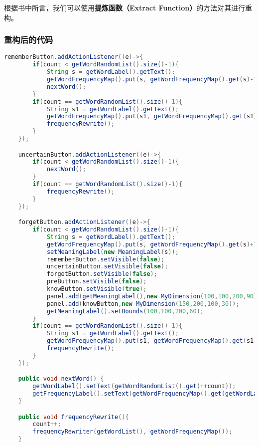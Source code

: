 \documentclass[a4paper]{article}
\begin{document}
根据书中所言，我们可以使用\textbf{提炼函数（Extract Function）}的方法对其进行重构。
\subsubsection*{重构后的代码}
\begin{lstlisting}[language={java}]
    rememberButton.addActionListener((e)->{
        if(count < getWordRandomList().size()-1){
            String s = getWordLabel().getText();
            getWordFrequencyMap().put(s, getWordFrequencyMap().get(s)-1);
            nextWord();
        }
        if(count == getWordRandomList().size()-1){
            String s1 = getWordLabel().getText();
            getWordFrequencyMap().put(s1, getWordFrequencyMap().get(s1)-1);
            frequencyRewrite();
        }
    });

    uncertainButton.addActionListener((e)->{
        if(count < getWordRandomList().size()-1){
            nextWord();
        }
        if(count == getWordRandomList().size()-1){
            frequencyRewrite();
        }
    });

    forgetButton.addActionListener((e)->{
        if(count < getWordRandomList().size()-1){
            String s = getWordLabel().getText();
            getWordFrequencyMap().put(s, getWordFrequencyMap().get(s)+1);
            setMeaningLabel(new MeaningLabel(s));
            rememberButton.setVisible(false);
            uncertainButton.setVisible(false);
            forgetButton.setVisible(false);
            preButton.setVisible(false);
            knowButton.setVisible(true);
            panel.add(getMeaningLabel(),new MyDimension(100,100,200,90));
            panel.add(knowButton,new MyDimension(150,200,100,30));
            getMeaningLabel().setBounds(100,100,200,60);
        }
        if(count == getWordRandomList().size()-1){
            String s1 = getWordLabel().getText();
            getWordFrequencyMap().put(s1, getWordFrequencyMap().get(s1)+1);
            frequencyRewrite();
        }
    });

    public void nextWord() {
        getWordLabel().setText(getWordRandomList().get(++count));
        getFrequencyLabel().setText(getWordFrequencyMap().get(getWordLabel().getText()).toString());
    }

    public void frequencyRewrite(){
        count++;
        frequencyRewriter(getWordList(), getWordFrequencyMap());
    }
\end{lstlisting}
\end{document}
